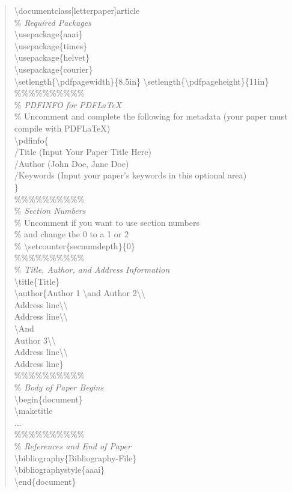 \documentclass[letterpaper]{article}
\begin{document}
\begin{quote}
\begin{small}
\textbackslash documentclass[letterpaper]{article}\\
\% \textit{Required Packages}\\
\textbackslash usepackage\{aaai\}\\
\textbackslash usepackage\{times\}\\
\textbackslash usepackage\{helvet\}\\
\textbackslash usepackage\{courier\}\\
\textbackslash setlength\{\textbackslash pdfpagewidth\}\{8.5in\}
\textbackslash setlength\{\textbackslash pdfpageheight\}\{11in\}\\
\%\%\%\%\%\%\%\%\%\%\\
\% \textit{PDFINFO for PDF\LaTeX{}}\\
\% Uncomment and complete the following for metadata (your paper must compile with PDF\LaTeX{})\\
\textbackslash pdfinfo\{\\
/Title (Input Your Paper Title Here)\\
/Author (John Doe, Jane Doe)\\
/Keywords (Input your paper's keywords in this optional area)\\
\}\\
\%\%\%\%\%\%\%\%\%\%\\
\% \textit{Section Numbers}\\
\% Uncomment if you want to use section numbers\\
\% and change the 0 to a 1 or 2\\
\% \textbackslash setcounter\{secnumdepth\}\{0\}\\
\%\%\%\%\%\%\%\%\%\%\\
\% \textit{Title, Author, and Address Information}\\
\textbackslash title\{Title\}\\
\textbackslash author\{Author 1 \textbackslash and Author 2\textbackslash\textbackslash \\ 
Address line\textbackslash\textbackslash\\ Address line\textbackslash\textbackslash \\
\textbackslash And\\
Author 3\textbackslash\textbackslash\\ Address line\textbackslash\textbackslash\\ Address line\}\\
\%\%\%\%\%\%\%\%\%\%\\
\% \textit{Body of Paper Begins}\\
\textbackslash begin\{document\}\\
\textbackslash maketitle\\
...\\
\%\%\%\%\%\%\%\%\%\%\\
\% \textit{References and End of Paper}\\
\textbackslash bibliography\{Bibliography-File\}\\
\textbackslash bibliographystyle\{aaai\}\\
\textbackslash end\{document\}
\end{small}
\end{quote}
\end{document}
